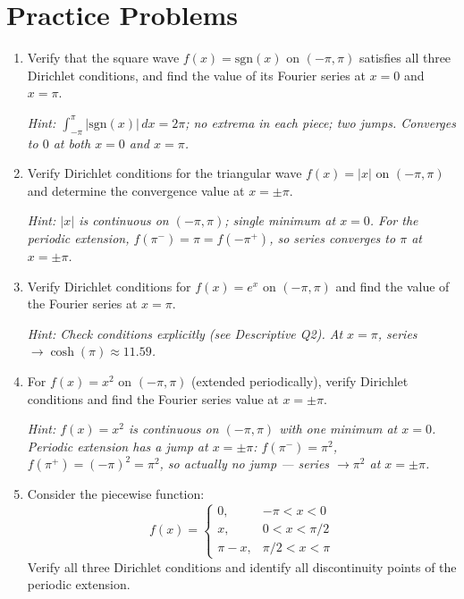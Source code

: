 \documentclass[12pt,a4paper]{article}
\begin{document}
\section{Practice Problems}

\begin{enumerate}[label=\textbf{P\arabic*.}]

\item Verify that the square wave $f(x) = \text{sgn}(x)$ on $(-\pi,\pi)$ satisfies all three Dirichlet conditions, and find the value of its Fourier series at $x=0$ and $x=\pi$.

   \textit{Hint: $\int_{-\pi}^{\pi}|\text{sgn}(x)|\,dx = 2\pi$; no extrema in each piece; two jumps. Converges to $0$ at both $x=0$ and $x=\pi$.}

\item Verify Dirichlet conditions for the triangular wave $f(x) = |x|$ on $(-\pi,\pi)$ and determine the convergence value at $x=\pm\pi$.

   \textit{Hint: $|x|$ is continuous on $(-\pi,\pi)$; single minimum at $x=0$. For the periodic extension, $f(\pi^-)=\pi=f(-\pi^+)$, so series converges to $\pi$ at $x=\pm\pi$.}

\item Verify Dirichlet conditions for $f(x)=e^x$ on $(-\pi,\pi)$ and find the value of the Fourier series at $x=\pi$.

   \textit{Hint: Check conditions explicitly (see Descriptive Q2). At $x=\pi$, series $\to \cosh(\pi) \approx 11.59$.}

\item For $f(x) = x^2$ on $(-\pi,\pi)$ (extended periodically), verify Dirichlet conditions and find the Fourier series value at $x=\pm\pi$.

   \textit{Hint: $f(x)=x^2$ is continuous on $(-\pi,\pi)$ with one minimum at $x=0$. Periodic extension has a jump at $x=\pm\pi$: $f(\pi^-)=\pi^2$, $f(\pi^+)=(-\pi)^2=\pi^2$, so actually no jump --- series $\to \pi^2$ at $x=\pm\pi$.}

\item Consider the piecewise function:
   \[
      f(x) = \begin{cases} 0, & -\pi < x < 0 \\ x, & 0 < x < \pi/2 \\ \pi - x, & \pi/2 < x < \pi \end{cases}
   \]
   Verify all three Dirichlet conditions and identify all discontinuity points of the periodic extension.


\end{enumerate}
\end{document}

